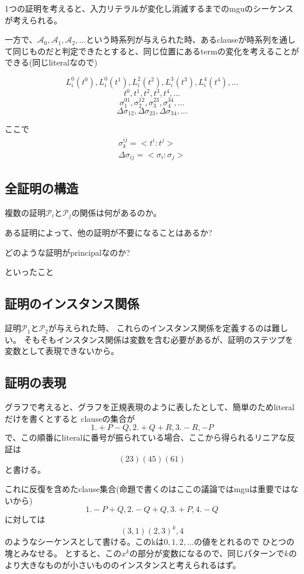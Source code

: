 \documentclass[10pt, oneside]{jarticle}   	%
\begin{document}
1つの証明を考えると、入力リテラルが変化し消滅するまでのmguのシーケンスが考えられる。

一方で、$\mathcal{A}_0,\mathcal{A}_1,\mathcal{A}_2,\dots$という時系列が与えられた時、あるclauseが時系列を通して同じものだと判定できたとすると、同じ位置にあるtermの変化を考えることができる(同じliteralなので)

$$L^0_i(t^0),L^0_i(t^1),L^2_i(t^2),L^3_i(t^3),L^4_i(t^4),\dots$$
$$ t^0, t^1, t^2, t^3, t^4, \dots$$
$$ \sigma^{01}_1, \sigma^{12}_2,\sigma^{23}_3, \sigma^{34}_4, \dots$$
$$ \Delta\sigma_{12},\Delta\sigma_{23},\Delta\sigma_{34},\dots$$

ここで
\begin{eqnarray*}
\sigma^{ij}_k = <t^i:t^j> \\
\Delta\sigma_{ij} = <\sigma_i:\sigma_j>
\end{eqnarray*}


\subsection{全証明の構造}
複数の証明$\mathcal{P}_i$と$\mathcal{P}_j$の関係は何があるのか。

ある証明によって、他の証明が不要になることはあるか?

どのような証明がprincipalなのか?

といったこと

\subsection{証明のインスタンス関係}
証明$\mathcal{P}_1$と$\mathcal{P}_2$が与えられた時、
これらのインスタンス関係を定義するのは難しい。
そもそもインスタンス関係は変数を含む必要があるが、証明のステツプを変数として表現できないから。

\subsection{証明の表現}
グラフで考えると、グラフを正規表現のように表したとして、簡単のためliteralだけを書くとすると
clauseの集合が
$$1.+P-Q, 2.+Q+R, 3.-R,-P$$
で、この順番にliteralに番号が振られている場合、ここから得られるリニアな反証は
$$(23)(45)(61)$$
と書ける。

これに反復を含めたclause集合(命題で書くのはここの議論ではmguは重要ではないから)
$$1.-P+Q, 2.-Q+Q, 3.+P,4.-Q$$
に対しては
$$(3,1)(2,3)^k,4$$
のようなシーケンスとして書ける。このkは$0,1,2,\dots$の値をとれるので
ひとつの塊とみなせる。
とすると、この$x^k$の部分が変数になるので、同じパターンで$k$のより大きなものが小さいもののインスタンスと考えられるはず。
\end{document}
